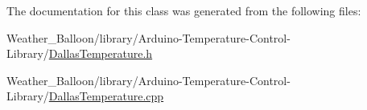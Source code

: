 The documentation for this class was generated from the following files\+:\begin{DoxyCompactItemize}
\item 
Weather\+\_\+\+Balloon/library/\+Arduino-\/\+Temperature-\/\+Control-\/\+Library/\hyperlink{_dallas_temperature_8h}{Dallas\+Temperature.\+h}\item 
Weather\+\_\+\+Balloon/library/\+Arduino-\/\+Temperature-\/\+Control-\/\+Library/\hyperlink{_dallas_temperature_8cpp}{Dallas\+Temperature.\+cpp}\end{DoxyCompactItemize}
